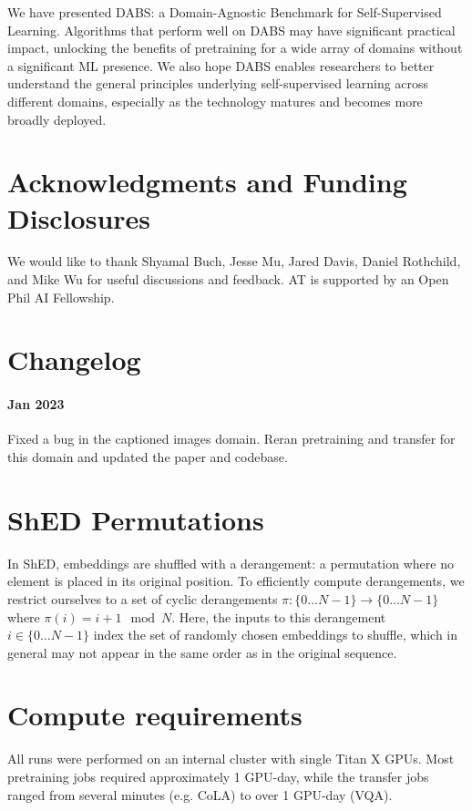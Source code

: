 \documentclass{article}
\begin{document}
We have presented DABS: a Domain-Agnostic Benchmark for Self-Supervised Learning. Algorithms that perform well on DABS may have significant practical impact, unlocking the benefits of pretraining for a wide array of domains without a significant ML presence. We also hope DABS enables researchers to better understand the general principles underlying self-supervised learning across different domains, especially as the technology matures and becomes more broadly deployed.

\section*{Acknowledgments and Funding Disclosures}
We would like to thank Shyamal Buch, Jesse Mu, Jared Davis, Daniel Rothchild, and Mike Wu for useful discussions and feedback. AT is supported by an Open Phil AI Fellowship.






\newpage
\appendix

\section{Changelog}
\paragraph{Jan 2023} Fixed a bug in the captioned images domain. Reran pretraining and transfer for this domain and updated the paper and codebase.

\section{ShED Permutations}

In ShED, embeddings are shuffled with a derangement: a permutation where no element is placed in its original position. To efficiently compute derangements, we restrict ourselves to a set of cyclic derangements $\pi : \{0 \ldots N-1\} \to \{0 \ldots N-1\}$ where $\pi(i) = {i + 1 \mod N}$. Here, the inputs to this derangement $i \in \{0 \ldots N-1\}$ index the set of randomly chosen embeddings to shuffle, which in general may not appear in the same order as in the original sequence.

\section{Compute requirements}
\label{appendix:compute}
All runs were performed on an internal cluster with single Titan X GPUs. Most pretraining jobs required approximately 1 GPU-day, while the transfer jobs ranged from several minutes (e.g. CoLA) to over 1 GPU-day (VQA).
\end{document}
